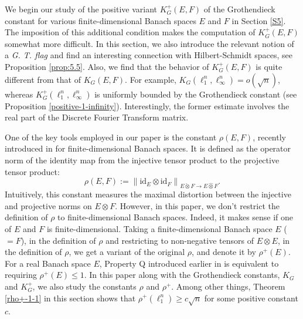 \documentclass[a4paper,oneside,11pt, reqno]{amsart}
\numberwithin{equation}{section}
\theoremstyle{plain}
\begin{document}
  We begin our study of the positive variant $K_G^+(E,F)$ of the Grothendieck constant for various finite-dimensional Banach spaces $E$ and $F$ in Section \ref{S5}. The imposition of this additional condition makes the computation of $K_G^{+}(E,F)$ somewhat more difficult.  In this section, we also introduce the relevant notion of a \textit{G. T. flag} and find an interesting connection with Hilbert-Schmidt spaces, see Proposition \ref{prop:5.5}.  Also, we find that the behavior of $K_G^{+}(E,F)$ is quite different from that of $K_G(E,F)$. For example, $K_G(\ell_1^n,\ell_\infty^n)=o(\sqrt{n})$, whereas $K_G^{+}(\ell_1^n,\ell_\infty^n)$ is uniformly bounded by the Grothendieck constant (see Proposition \ref{positive-1-infinity}). Interestingly, the former estimate involves the real part of the Discrete Fourier Transform matrix. 
  
One of the key tools employed in our paper is the constant \( \rho(E, F) \), recently introduced in \cite{XOR games and GT} for finite-dimensional Banach spaces. It is defined as the operator norm of the identity map from the injective tensor product to the projective tensor product:
\[
\rho(E, F) := \left\| \mathrm{id}_E \otimes \mathrm{id}_F \right\|_{E \check{\otimes} F \to E \hat{\otimes} F}.
\]
Intuitively, this constant measures the maximal distortion between the injective and projective norms on \( E \otimes F \).
However, in this paper, we don't restrict the definition of $\rho$ to finite-dimensional Banach spaces. Indeed, it makes sense if one of $E$ and $F$ is finite-dimensional.    
Taking a finite-dimensional Banach space $E$ ($=F$), in the definition of $\rho$ and restricting to non-negative tensors of $E\otimes E$,
in the definition of $\rho$, we get a variant of the original $\rho$, and denote it by $\rho^+(E)$. For a real Banach space $E$,  Property Q 
introduced earlier in \cite{BM} is equivalent to requiring $\rho^+(E) \leqslant 1$. 
In this paper along with the Grothendieck constants, $K_G$ and $K_G^+$, we also study the constants $\rho$ and $\rho^+$. Among other things, Theorem \ref{rho+-1-1} in this section shows that $\rho^+(\ell_1^n) \geq c \sqrt{n}$ for some positive constant $c$. 
\end{document}
